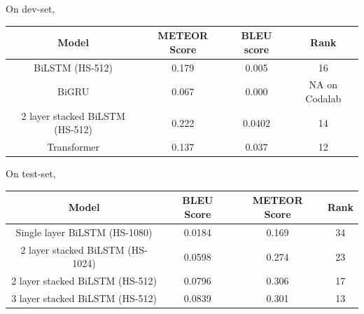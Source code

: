 \documentclass[11pt, oneside]{article}   	%
\begin{document}
On dev-set,
\begin{center}
\begin{tabular}{ ||c|c|c|c|| } 
 \hline
 Model & METEOR Score & BLEU score & Rank \\ [0.5ex] 
 \hline\hline
 BiLSTM (HS-512)& 0.179 & 0.005 & 16 \\
 \hline
 BiGRU & 0.067 & 0.000 & NA on Codalab \\
 \hline
 2 layer stacked BiLSTM (HS-512) & 0.222 & 0.0402 & 14 \\
 \hline
 Transformer &0.137 &0.037 &12\\
 \hline
\end{tabular}
\end{center}

On test-set,
\begin{center}
\begin{tabular}{ ||c|c|c|c|| } 
 \hline
 Model & BLEU Score & METEOR Score & Rank \\ [0.5ex] 
 \hline\hline
 Single layer  BiLSTM (HS-1080) & 0.0184 & 0.169 & 34\\
 \hline
 2 layer stacked BiLSTM (HS-1024) & 0.0598 & 0.274 & 23 \\
 \hline
  2 layer stacked BiLSTM (HS-512) & 0.0796 & 0.306 & 17 \\
  \hline
 3 layer stacked BiLSTM (HS-512) & 0.0839 & 0.301 & 13\\
 \hline
\end{tabular}
\end{center}
\end{document}
